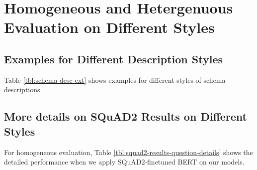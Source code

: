 \section{Homogeneous and Hetergenuous Evaluation on Different Styles}
\label{sec:sgd:more-desc-results}

\subsection{Examples for Different Description Styles}
\label{ssec:sgd:appendices-example-style}
Table \ref{tbl:schema-desc-ext} shows examples for different styles of schema descriptions.

\subsection{More details on SQuAD2 Results on Different Styles}
\label{ssec:sgd:squad2_homo}
For homogeneous evaluation, Table
\ref{tbl:squad2-results-question-details} shows the detailed
performance when we apply SQuAD2-finetuned BERT on our models.
